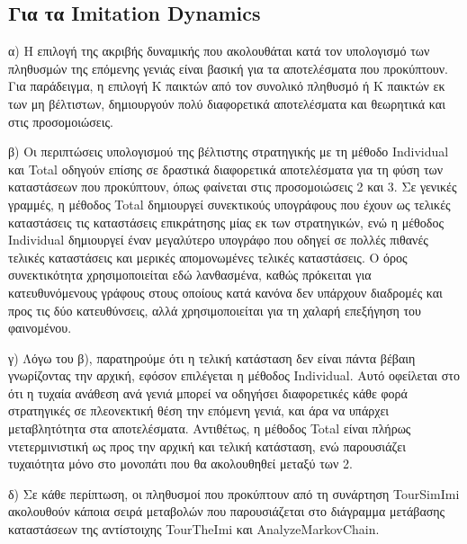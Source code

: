 \documentclass[12pt]{article}
\begin{document}
\subsection*{Για τα Imitation Dynamics}
α) Η επιλογή της ακριβής δυναμικής που ακολουθάται κατά τον υπολογισμό των πληθυσμών της επόμενης γενιάς είναι βασική για τα αποτελέσματα που προκύπτουν. Για παράδειγμα, η επιλογή K παικτών από τον συνολικό πληθυσμό ή K παικτών εκ των μη βέλτιστων, δημιουργούν πολύ διαφορετικά αποτελέσματα και θεωρητικά και στις προσομοιώσεις.

β) Οι περιπτώσεις υπολογισμού της βέλτιστης στρατηγικής με τη μέθοδο In\-di\-vi\-du\-al και Total οδηγούν επίσης σε δραστικά διαφορετικά αποτελέσματα για τη φύση των καταστάσεων που προκύπτουν, όπως φαίνεται στις προσομοιώσεις 2 και 3. Σε γενικές γραμμές, η μέθοδος Total δημιουργεί συνεκτικούς υπογράφους που έχουν ως τελικές καταστάσεις τις καταστάσεις επικράτησης μίας εκ των στρατηγικών, ενώ η μέθοδος Individual δημιουργεί έναν μεγαλύτερο υπογράφο που οδηγεί σε πολλές πιθανές τελικές καταστάσεις και μερικές απομονωμένες τελικές καταστάσεις. Ο όρος συνεκτικότητα χρησιμοποιείται εδώ λανθασμένα, καθώς πρόκειται για κατευθυνόμενους γράφους στους οποίους κατά κανόνα δεν υπάρχουν διαδρομές και προς τις δύο κατευθύνσεις, αλλά χρησιμοποιείται για τη χαλαρή επεξήγηση του φαινομένου.

γ) Λόγω του β), παρατηρούμε ότι η τελική κατάσταση δεν είναι πάντα βέβαιη γνωρίζοντας την αρχική, εφόσον επιλέγεται η μέθοδος Individual. Αυτό οφείλεται στο ότι η τυχαία ανάθεση ανά γενιά μπορεί να οδηγήσει διαφορετικές κάθε φορά στρατηγικές σε πλεονεκτική θέση την επόμενη γενιά, και άρα να υπάρχει μεταβλητότητα στα αποτελέσματα. Αντιθέτως, η μέθοδος Total είναι πλήρως ντετερμινιστική ως προς την αρχική και τελική κατάσταση, ενώ παρουσιάζει τυχαιότητα μόνο στο μονοπάτι που θα ακολουθηθεί μεταξύ των 2.

δ) Σε κάθε περίπτωση, οι πληθυσμοί που προκύπτουν από τη συνάρτηση Tour\-Sim\-Imi ακολουθούν κάποια σειρά μεταβολών που παρουσιάζεται στο διάγραμμα μετάβασης καταστάσεων της αντίστοιχης Tour\-The\-Imi και Analyze\-Markov\-Chain.
\clearpage
\listoffigures{}
\end{document}

